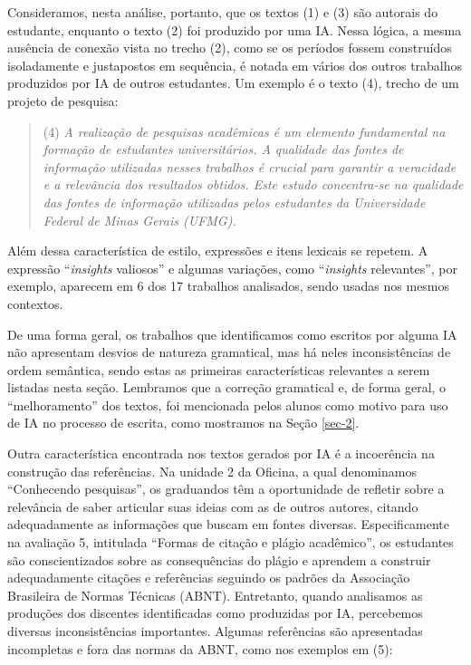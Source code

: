 \documentclass[portuguese]{textolivre}
\begin{document}
Consideramos, nesta análise, portanto, que os textos (1) e (3) são autorais do estudante, enquanto o texto (2) foi produzido por uma IA. Nessa lógica, a mesma ausência de conexão vista no trecho (2), como se os períodos fossem construídos isoladamente e justapostos em sequência, é notada em vários dos outros trabalhos produzidos por IA de outros estudantes. Um exemplo é o texto (4), trecho de um projeto de pesquisa:

\begin{quote}
    (4) \textit{A realização de pesquisas acadêmicas é um elemento fundamental na formação de estudantes universitários. A qualidade das fontes de informação utilizadas nesses trabalhos é crucial para garantir a veracidade e a relevância dos resultados obtidos. Este estudo concentra-se na qualidade das fontes de informação utilizadas pelos estudantes da Universidade Federal de Minas Gerais (UFMG).}
\end{quote}

Além dessa característica de estilo, expressões e itens lexicais se repetem. A expressão ``\textit{insights} valiosos'' e algumas variações, como ``\textit{insights} relevantes'', por exemplo, aparecem em 6 dos 17 trabalhos analisados, sendo usadas nos mesmos contextos.

De uma forma geral, os trabalhos que identificamos como escritos por alguma IA não apresentam desvios de natureza gramatical, mas há neles inconsistências de ordem semântica, sendo estas as primeiras características relevantes a serem listadas nesta seção. Lembramos que a correção gramatical e, de forma geral, o ``melhoramento'' dos textos, foi mencionada pelos alunos como motivo para uso de IA no processo de escrita, como mostramos na Seção \ref{sec-2}.

Outra característica encontrada nos textos gerados por IA é a incoerência na construção das referências. Na unidade 2 da Oficina, a qual denominamos “Conhecendo pesquisas”, os graduandos têm a oportunidade de refletir sobre a relevância de saber articular suas ideias com as de outros autores, citando adequadamente as informações que buscam em fontes diversas. Especificamente na avaliação 5, intitulada ``Formas de citação e plágio acadêmico'', os estudantes são conscientizados sobre as consequências do plágio e aprendem a construir adequadamente citações e referências seguindo os padrões da Associação Brasileira de Normas Técnicas (ABNT). Entretanto, quando analisamos as produções dos discentes identificadas como produzidas por IA, percebemos diversas inconsistências importantes. Algumas referências são apresentadas incompletas e fora das normas da ABNT, como nos exemplos em (5):
\end{document}
